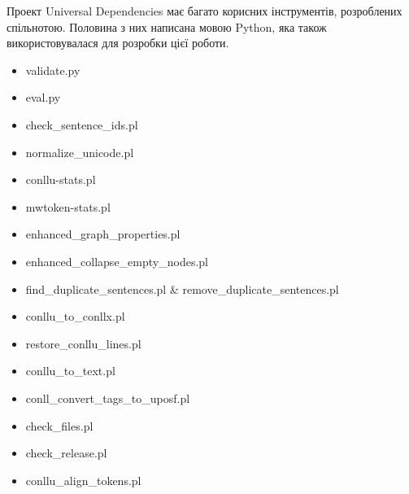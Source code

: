 Проект Universal Dependencies має багато корисних інструментів, розроблених спільнотою.
Половина з них написана мовою Python, яка також використовувалася для розробки цієї
роботи. 



\begin{itemize}
  \item validate.py
  \item eval.py
  \item check\_sentence\_ids.pl
  \item normalize\_unicode.pl
  \item conllu-stats.pl
  \item mwtoken-stats.pl
  \item enhanced\_graph\_properties.pl
  \item enhanced\_collapse\_empty\_nodes.pl
  \item find\_duplicate\_sentences.pl \& remove\_duplicate\_sentences.pl
  \item conllu\_to\_conllx.pl
  \item restore\_conllu\_lines.pl
  \item conllu\_to\_text.pl
  \item conll\_convert\_tags\_to\_uposf.pl
  \item check\_files.pl
  \item check\_release.pl
  \item conllu\_align\_tokens.pl
\end{itemize}